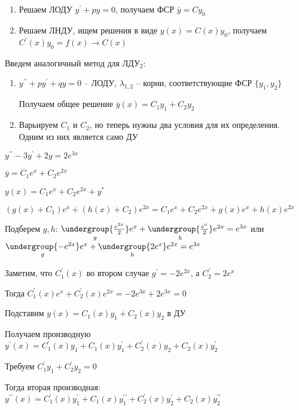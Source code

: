 \documentclass[12pt]{article}
\begin{document}
    \begin{enumerate}[label*=\arabic*) ]
        \item Решаем ЛОДУ $y^\prime + py = 0$, получаем ФСР $\overline{y} = Cy_0$

        \item Решаем ЛНДУ, ищем решения в виде $y(x) = C(x)y_0$, получаем $C^\prime(x) y_0 = f(x) \to C(x)$
    \end{enumerate}

    \Nota Введем аналогичный метод для ЛДУ$_2$:

    \begin{enumerate}[label*=\arabic* этап) ]
        \item $y^{\prime\prime} + py^\prime + qy = 0$ -- ЛОДУ, $\lambda_{1, 2}$ -- корни, соответствующие ФСР $\{y_1, y_2\}$

        Получаем общее решение $\overline{y}(x) = C_1 y_1 + C_2 y_2$

        \item Варьируем $C_1$ и $C_2$, но теперь нужны два условия для их определения. Одним из них является само ДУ
    \end{enumerate}

    \Ex $y^{\prime\prime} - 3y^\prime + 2y = 2e^{3x}$

    $\overline{y} = C_1 e^x + C_2 e^{2x}$

    $y(x) = C_1 e^x + C_2 e^{2x} + y^*$

    $(g(x) + C_1)e^x + (h(x) + C_2)e^{2x} = C_1 e^x + C_2 e^{2x} + g(x)e^x + h(x)e^{2x}$

    Подберем $g, h$: $\underset{g}{\undergroup{\frac{e^{2x}}{2}}}e^x + \underset{h}{\undergroup{\frac{e^x}{2}}}e^{2x} = e^{3x}$ или
    $\underset{g}{\undergroup{-e^{2x}}} e^x + \underset{h}{\undergroup{2e^x}} e^{2x} = e^{3x}$

    Заметим, что $C_1^\prime(x)$ во втором случае $g^\prime = -2e^{2x}$, а $C_2^\prime = 2e^x$

    Тогда $C_1^\prime(x) e^x + C^\prime_2 (x) e^{2x} = -2e^{3x} + 2e^{3x} = 0$

    \Nota Подставим $y(x) = C_1 (x) y_1 + C_2 (x) y_2$ в ДУ

    Получаем производную $y^\prime(x) = C^\prime_1(x) y_1 + C_1(x)y^\prime_1 + C^\prime_2(x) y_2 + C_2(x)y^\prime_2$

    Требуем $C^\prime_1 y_1 + C_2^\prime y_2 = 0$

    Тогда вторая производная: $y^{\prime\prime}(x) = C_1^\prime (x) y_1^\prime + C_1 (x) y_1^{\prime\prime} + C_2^\prime (x) y_2^\prime + C_2 (x) y_2^{\prime\prime}$
\end{document}
